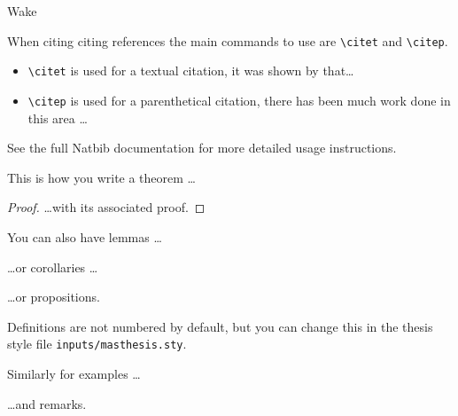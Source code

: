 \begin{chapter}{\label{cha:wake}Wake}

  
  When citing citing references the main commands to use are \verb"\citet" and
  \verb"\citep".

  \begin{itemize}
    \item \verb"\citet" is used for a textual citation, \eg it was shown by
      \citet{allen_zaremba_13} that\ldots
    \item \verb"\citep" is used for a parenthetical citation, \eg there has
      been much work done in this area \citep[see, for
      example,][]{allen_zaremba_13,Neely}\ldots
  \end{itemize}

  \noindent See the full Natbib documentation for more detailed usage
  instructions.

  \begin{theorem}
    This is how you write a theorem \ldots
  \end{theorem}
  \begin{proof}
    \ldots with its associated proof.
  \end{proof}

  \begin{lemma}
    You can also have lemmas \ldots
  \end{lemma}

  \begin{corollary}
    \ldots or corollaries \ldots
  \end{corollary}

  \begin{proposition}
    \dots or propositions.
  \end{proposition}

  \begin{definition}
    Definitions are not numbered by default, but you can change this in the
    thesis style file \verb"inputs/masthesis.sty".
  \end{definition}

  \begin{example}
    Similarly for examples \ldots
  \end{example}

  \begin{remark}
    \ldots and remarks.
  \end{remark}


\end{chapter}
